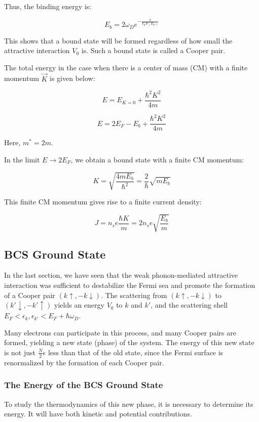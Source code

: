 \documentclass{article}
\begin{document}
Thus, the binding energy is:

\[
E_b = 2\omega_D e^{-\frac{2}{V_0 P(E_F)}}
\]

This shows that a bound state will be formed regardless of how small the attractive interaction \( V_0 \) is. Such a bound state is called a Cooper pair.

The total energy in the case when there is a center of mass (CM) with a finite momentum \( \vec{K} \) is given below:

\[
E = E_{K=0} + \frac{\hbar^2 K^2}{4m}
\]

\[
E = 2E_F - E_b + \frac{\hbar^2 K^2}{4m}
\]

Here, \( m^* = 2m \).

In the limit \( E \to 2E_F \), we obtain a bound state with a finite CM momentum:

\[
K = \sqrt{\frac{4m E_b}{\hbar^2}} = \frac{2}{\hbar} \sqrt{m E_b}
\]

This finite CM momentum gives rise to a finite current density:

\[
J = n_s e \frac{\hbar K}{m} = 2n_s e \sqrt{\frac{E_b}{m}}
\]

\subsection{BCS Ground State}

In the last section, we have seen that the weak phonon-mediated attractive interaction was sufficient to destabilize the Fermi sea and promote the formation of a Cooper pair \( (k \uparrow, -k \downarrow) \). The scattering from \( (k \uparrow, -k \downarrow) \) to \( (k' \downarrow, -k' \uparrow) \) yields an energy \( V_0 \) to \( k \) and \( k' \), and the scattering shell \( E_F < \epsilon_k, \epsilon_{k'} < E_F + \hbar \omega_D \).

Many electrons can participate in this process, and many Cooper pairs are formed, yielding a new state (phase) of the system. The energy of this new state is not just \( \frac{N}{2} \epsilon \) less than that of the old state, since the Fermi surface is renormalized by the formation of each Cooper pair.

\subsubsection{The Energy of the BCS Ground State}

To study the thermodynamics of this new phase, it is necessary to determine its energy. It will have both kinetic and potential contributions.
\end{document}
